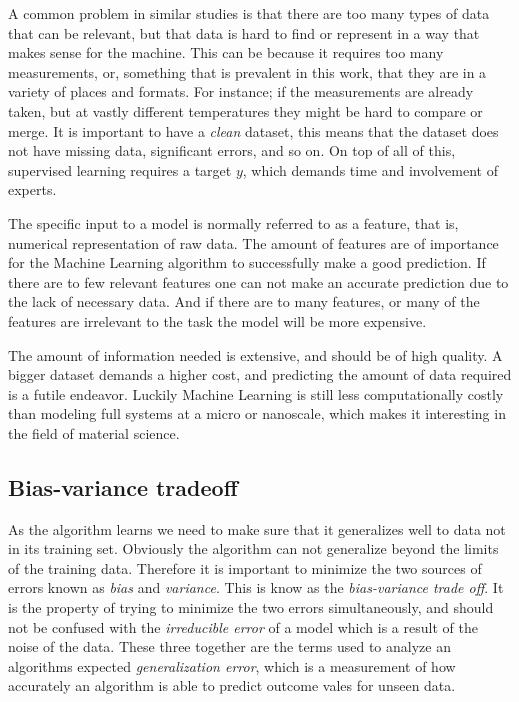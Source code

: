 	A common problem in similar studies is that there are too many types of data that can be relevant, but that data is hard to find or represent in a way that makes sense for the machine. This can be because it requires too many measurements, or, something that is prevalent in this work, that they are in a variety of places and formats. For instance; if the measurements are already taken, but at vastly different temperatures they might be hard to compare or merge. It is important to have a \textit{clean} dataset, this means that the dataset does not have missing data, significant errors, and so on. On top of all of this, supervised learning requires a target $y$, which demands time and involvement of experts. 
	
	The specific input to a model is normally referred to as a feature, that is, numerical representation of raw data. The amount of features are of importance for the Machine Learning algorithm to successfully make a good prediction. If there are to few relevant features one can not make an accurate prediction due to the lack of necessary data. And if there are to many features, or many of the features are irrelevant to the task the model will be more expensive.
	
	The amount of information needed is extensive, and should be of high quality. A bigger dataset demands a higher cost, and predicting the amount of data required is a futile endeavor. Luckily Machine Learning is still less computationally costly than modeling full systems at a micro or nanoscale, which makes it interesting in the field of material science. 
	
	
\subsection{Bias-variance tradeoff}\label{sec:Bias-variance tradeoff}

As the algorithm learns we need to make sure that it generalizes well to data not in its training set. Obviously the algorithm can not generalize beyond the limits of the training data. Therefore it is important to minimize the two sources of errors known as \textit{bias} and \textit{variance}. This is know as the \textit{bias-variance trade off}. It is the property of trying to minimize the two errors simultaneously, and should not be confused with the \textit{irreducible error} of a model which is a result of the noise of the data. These three together are the terms used to analyze an algorithms expected \textit{generalization error}, which is a measurement of how accurately an algorithm is able to predict outcome vales for unseen data.    


